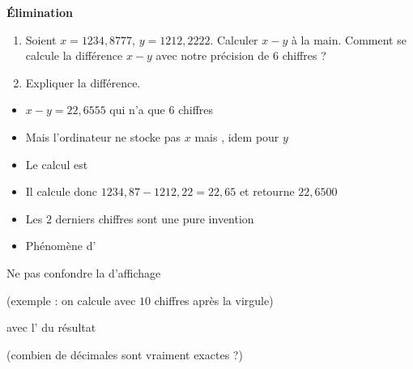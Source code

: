 \begin{frame}
  
\hfill\hfill\textbf{\'Elimination}

\begin{tp}
\begin{enumerate}
  \item Soient $x = 1234,8777$, $y = 1212,2222$. Calculer $x-y$ à la main.
  Comment se calcule la différence $x-y$ avec notre précision
  de $6$ chiffres ?
  \item Expliquer la différence.
\end{enumerate}  
\end{tp}

\pause

\begin{itemize}
  \item $x-y = 22,6555$ qui n'a que $6$ chiffres
\pause
  \item Mais l'ordinateur ne stocke pas $x$ mais , idem pour $y$
\pause
  \item Le calcul est 
\pause
  \item Il calcule donc $1234,87-1212,22=22,65$ et retourne $22,6500$
\pause
  \item Les $2$ derniers chiffres sont une pure invention
\pause
  \item Phénomène d'
\end{itemize}

\pause
\vspace*{-1ex}

\begin{center}
Ne pas confondre la  d'affichage

(exemple : on calcule avec $10$ chiffres après la virgule) 

avec l' du résultat

(combien de décimales sont vraiment exactes ?)
\end{center}
\end{frame}

